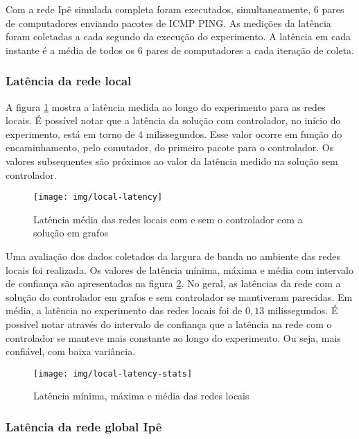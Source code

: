 Com a rede Ipê simulada completa foram executados, simultaneamente,
6 pares de computadores enviando pacotes de ICMP PING.
As medições da latência foram coletadas a cada segundo da execução do
experimento.
A latência em cada instante é a média de todos os 6 pares de computadores
a cada iteração de coleta.

\subsubsection{Latência da rede local}

A figura \ref{fig:local-latency} mostra a latência medida ao longo do
experimento para as redes locais.
É possível notar que a latência da solução com controlador, no início do
experimento, está em torno de 4 milissegundos.
Esse valor ocorre em função do encaminhamento, pelo comutador, do primeiro
pacote para o controlador.
Os valores subsequentes são próximos ao valor da latência medido na solução
sem controlador.

\begin{figure}[!htb]
    \centering
    \label{fig:local-latency}
    \texttt{[image: img/local-latency]}
    \caption{Latência média das redes locais com e sem o controlador com a
    solução em grafos}
\end{figure}

Uma avaliação dos dados coletados da largura de banda no ambiente das
redes locais foi realizada.
Os valores de latência mínima, máxima e média com intervalo de confiança
são apresentados na figura \ref{fig:local-latency-stats}.
No geral, as latências da rede com a solução do controlador em grafos e
sem controlador se mantiveram parecidas.
Em média, a latência no experimento das redes locais foi de
$0,13$ milissegundos.
É possível notar através do intervalo de confiança que a latência na rede
com o controlador se manteve mais constante ao longo do experimento.
Ou seja, mais confiável, com baixa variância.

\begin{figure}[!htb]
    \centering
    \label{fig:local-latency-stats}
    \texttt{[image: img/local-latency-stats]}
    \caption{Latência mínima, máxima e média das redes locais}
\end{figure}


\subsubsection{Latência da rede global Ipê}


